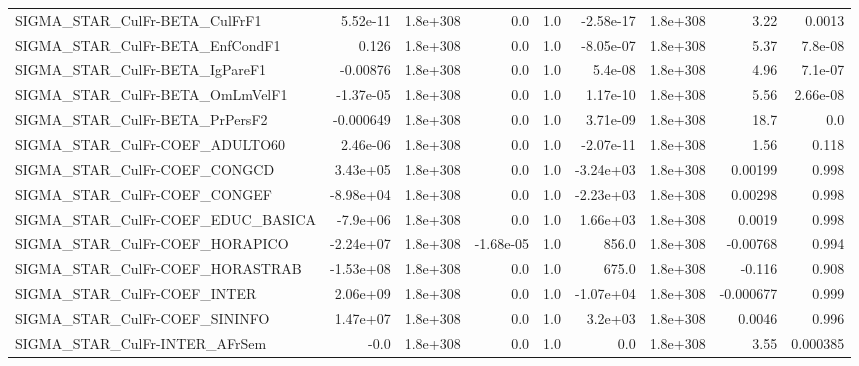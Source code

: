 \begin{tabular}{lrrrrrrrr}
SIGMA\_STAR\_CulFr-BETA\_CulFrF1         &    5.52e-11 &     1.8e+308 &        0.0 &      1.0 &  -2.58e-17 &    1.8e+308 &         3.22 &        0.0013 \\
SIGMA\_STAR\_CulFr-BETA\_EnfCondF1       &       0.126 &     1.8e+308 &        0.0 &      1.0 &  -8.05e-07 &    1.8e+308 &         5.37 &       7.8e-08 \\
SIGMA\_STAR\_CulFr-BETA\_IgPareF1        &    -0.00876 &     1.8e+308 &        0.0 &      1.0 &    5.4e-08 &    1.8e+308 &         4.96 &       7.1e-07 \\
SIGMA\_STAR\_CulFr-BETA\_OmLmVelF1       &   -1.37e-05 &     1.8e+308 &        0.0 &      1.0 &   1.17e-10 &    1.8e+308 &         5.56 &      2.66e-08 \\
SIGMA\_STAR\_CulFr-BETA\_PrPersF2        &   -0.000649 &     1.8e+308 &        0.0 &      1.0 &   3.71e-09 &    1.8e+308 &         18.7 &           0.0 \\
SIGMA\_STAR\_CulFr-COEF\_ADULTO60        &    2.46e-06 &     1.8e+308 &        0.0 &      1.0 &  -2.07e-11 &    1.8e+308 &         1.56 &         0.118 \\
SIGMA\_STAR\_CulFr-COEF\_CONGCD          &    3.43e+05 &     1.8e+308 &        0.0 &      1.0 &  -3.24e+03 &    1.8e+308 &      0.00199 &         0.998 \\
SIGMA\_STAR\_CulFr-COEF\_CONGEF          &   -8.98e+04 &     1.8e+308 &        0.0 &      1.0 &  -2.23e+03 &    1.8e+308 &      0.00298 &         0.998 \\
SIGMA\_STAR\_CulFr-COEF\_EDUC\_BASICA     &    -7.9e+06 &     1.8e+308 &        0.0 &      1.0 &   1.66e+03 &    1.8e+308 &       0.0019 &         0.998 \\
SIGMA\_STAR\_CulFr-COEF\_HORAPICO        &   -2.24e+07 &     1.8e+308 &  -1.68e-05 &      1.0 &      856.0 &    1.8e+308 &     -0.00768 &         0.994 \\
SIGMA\_STAR\_CulFr-COEF\_HORASTRAB       &   -1.53e+08 &     1.8e+308 &        0.0 &      1.0 &      675.0 &    1.8e+308 &       -0.116 &         0.908 \\
SIGMA\_STAR\_CulFr-COEF\_INTER           &    2.06e+09 &     1.8e+308 &        0.0 &      1.0 &  -1.07e+04 &    1.8e+308 &    -0.000677 &         0.999 \\
SIGMA\_STAR\_CulFr-COEF\_SININFO         &    1.47e+07 &     1.8e+308 &        0.0 &      1.0 &    3.2e+03 &    1.8e+308 &       0.0046 &         0.996 \\
SIGMA\_STAR\_CulFr-INTER\_AFrSem         &        -0.0 &     1.8e+308 &        0.0 &      1.0 &        0.0 &    1.8e+308 &         3.55 &      0.000385 \\

\end{tabular}
